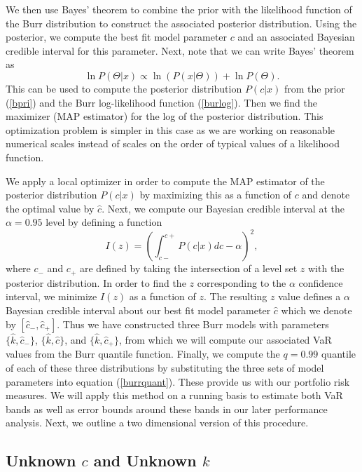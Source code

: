 \documentclass{amsart}
\begin{document}
We then use Bayes' theorem to combine the prior with the likelihood function of
the Burr distribution to construct the associated posterior distribution.  Using 
the posterior, we compute the best fit model parameter $c$ and an 
associated Bayesian credible interval for this parameter.  Next, 
note that we can write Bayes' theorem as 
%
\begin{equation}
    \ln P(\Theta|x) \propto \ln(P (x|\Theta)) + \ln  P(\Theta).
    \label{logbaythm}
\end{equation}
%
This can be used to compute the posterior distribution $P(c|x)$ from 
the prior (\ref{bpri}) and the Burr log-likelihood function (\ref{burlog}).
Then we find the maximizer (MAP estimator) for the log of the posterior distribution.
This 
optimization problem is simpler in this case as we are working on 
reasonable numerical scales instead of scales on the order of typical 
values of a likelihood function.

We apply a local optimizer in order to compute the MAP estimator 
of the posterior distribution $P(c|x)$ by maximizing this as a function of $c$ and 
denote the optimal value by $\hat{c}$.  
Next, we compute our Bayesian credible interval at the $\alpha=0.95$ level by 
defining a function 
%
\begin{equation}
    I(z) = \left(\int_{c-}^{c+} P(c|x)dc - \alpha\right)^2,
\end{equation}
%
where $c_-$ and $c_+$ are defined by taking the intersection of a level set $z$ with 
the posterior distribution.  In order to find the $z$ corresponding 
to the $\alpha$ confidence interval, we minimize $I(z)$ as a function of $z$.  
The resulting $z$ value defines 
a $\alpha$ Bayesian credible interval about our best fit model parameter $\hat{c}$ 
which we denote by $[\hat{c}_-, \hat{c}_+]$.  Thus we have constructed three 
Burr models with parameters $\{\hat{k},\hat{c}_-\}$, $\{\hat{k},\hat{c}\}$, and $\{\hat{k},\hat{c}_+\}$, 
from which we will compute our associated VaR values from the Burr quantile function. 
Finally, we compute the $q=0.99$ quantile of each of these three distributions by substituting 
the three sets of model parameters into equation (\ref{burrquant}).  These provide us 
with our portfolio risk measures.  We will apply this method on a running basis to 
estimate both VaR bands as well as error bounds around these bands in our 
later performance analysis.  Next, we outline a two dimensional version of this 
procedure.

\subsection{Unknown $c$ and Unknown $k$}
\end{document}
